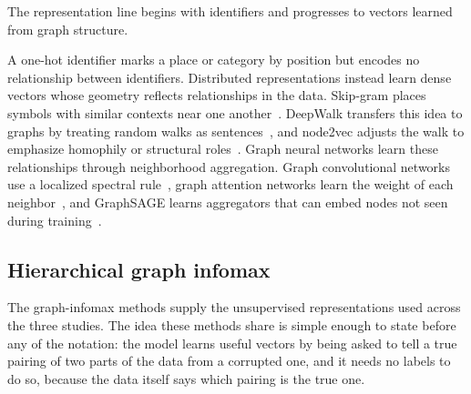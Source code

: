 The representation line begins with identifiers and progresses to vectors learned
from graph structure.


A one-hot identifier marks a place or category by position but encodes no relationship
between identifiers. Distributed representations instead learn dense vectors whose
geometry reflects relationships in the data. Skip-gram places symbols with similar
contexts near one another~\cite{mikolov2013word2vec}. DeepWalk transfers this idea to
graphs by treating random walks as sentences~\cite{perozzi2014deepwalk}, and node2vec
adjusts the walk to emphasize homophily or structural
roles~\cite{grover2016node2vec}. Graph neural networks learn these relationships
through neighborhood aggregation. Graph convolutional networks use a localized
spectral rule~\cite{kipf2017gcn}, graph attention networks learn the weight of each
neighbor~\cite{velivckovic2017graph}, and GraphSAGE learns aggregators that can embed
nodes not seen during training~\cite{hamilton2017graphsage}.

\subsection{Hierarchical graph infomax}

The graph-infomax methods supply the unsupervised representations used across the
three studies. The idea these methods share is simple enough to state before any of
the notation: the model learns useful vectors by being asked to tell a true pairing of
two parts of the data from a corrupted one, and it needs no labels to do so, because
the data itself says which pairing is the true one.

